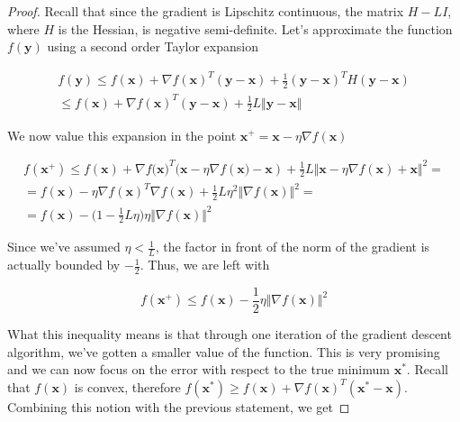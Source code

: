 \documentclass{article}
\numberwithin{equation}{subsection}
\begin{document}
\begin{proof}
Recall that since the gradient is Lipschitz continuous, the matrix $H - LI$, where $H$ is the Hessian, is negative semi-definite. Let's approximate the function $f(\textbf{y})$ using a second order Taylor expansion

\begin{gather*}
    f(\textbf{y}) \leq f(\textbf{x}) + \nabla f(\textbf{x})^T (\textbf{y} - \textbf{x}) + \frac{1}{2}(\textbf{y}-\textbf{x})^T H (\textbf{y}-\textbf{x}) \\
    \leq f(\textbf{x}) + \nabla f(\textbf{x})^T (\textbf{y}-\textbf{x}) + \frac{1}{2} L \Vert \textbf{y} - \textbf{x} \Vert
\end{gather*}

We now value this expansion in the point $\textbf{x}^+ = \textbf{x} - \eta \nabla f(\textbf{x}) $

\begin{gather*}
    f(\textbf{x}^+) \leq f(\textbf{x})+ \nabla f\big(\textbf{x})^T (\textbf{x}-\eta \nabla f(\textbf{x}\big) - \textbf{x}) + \frac{1}{2} L \Vert \textbf{x}-\eta \nabla f(\textbf{x}) + \textbf{x} \Vert^2 = \\
    = f(\textbf{x}) - \eta \nabla f(\textbf{x})^T \nabla f(\textbf{x}) + \frac{1}{2} L \eta^2 \Vert \nabla f(\textbf{x}) \Vert^2 = \\
    = f(\textbf{x}) - \Big( 1 - \frac{1}{2} L \eta \Big) \eta \Vert \nabla f(\textbf{x}) \Vert^2
\end{gather*}

Since we've assumed $\eta < \frac{1}{L}$, the factor in front of the norm of the gradient is actually bounded by $-\frac{1}{2}$. Thus, we are left with

\begin{equation*}
    f(\textbf{x}^+) \leq f(\textbf{x}) - \frac{1}{2} \eta \Vert \nabla f(\textbf{x}) \Vert^2
\end{equation*}

What this inequality means is that through one iteration of the gradient descent algorithm, we've gotten a smaller value of the function. This is very promising and we can now focus on the error with respect to the true minimum $\textbf{x}^*$. Recall that $f(\textbf{x})$ is convex, therefore $f(\textbf{x}^*) \geq f(\textbf{x}) + \nabla f(\textbf{x})^T (\textbf{x}^*-\textbf{x})$. Combining this notion with the previous statement, we get


\end{proof}
\end{document}
